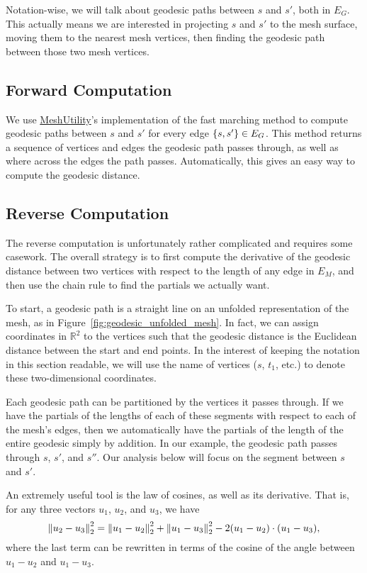 Notation-wise, we will talk about geodesic paths between \(s\) and \(s'\), both in \(E_G\). This actually means we are interested in projecting \(s\) and \(s'\) to the mesh surface, moving them to the nearest mesh vertices, then finding the geodesic path between those two mesh vertices.

\subsection{Forward Computation}
We use \href{https://github.com/zishun/MeshUtility}{MeshUtility}'s implementation of the fast marching method to compute geodesic paths between \(s\) and \(s'\) for every edge \(\cof{s, s'} \in E_G\). This method returns a sequence of vertices and edges the geodesic path passes through, as well as where across the edges the path passes. Automatically, this gives an easy way to compute the geodesic distance.

\subsection{Reverse Computation}
The reverse computation is unfortunately rather complicated and requires some casework. The overall strategy is to first compute the derivative of the geodesic distance between two vertices with respect to the length of any edge in \(E_M\), and then use the chain rule to find the partials we actually want.

To start, a geodesic path is a straight line on an unfolded representation of the mesh, as in Figure~\ref{fig:geodesic_unfolded_mesh}. In fact, we can assign coordinates in \(\mathbb{R}^2\) to the vertices such that the geodesic distance is the Euclidean distance between the start and end points. In the interest of keeping the notation in this section readable, we will use the name of vertices (\(s\), \(t_1\), etc.) to denote these two-dimensional coordinates.

Each geodesic path can be partitioned by the vertices it passes through. If we have the partials of the lengths of each of these segments with respect to each of the mesh's edges, then we automatically have the partials of the length of the entire geodesic simply by addition. In our example, the geodesic path passes through \(s\), \(s'\), and \(s''\). Our analysis below will focus on the segment between \(s\) and \(s'\).

An extremely useful tool is the law of cosines, as well as its derivative. That is, for any three vectors \(u_1\), \(u_2\), and \(u_3\), we have \[\norm{u_2 - u_3}_2^2 = \norm{u_1 - u_2}_2^2 + \norm{u_1 - u_3}_2^2 - 2\pof{u_1 - u_2} \cdot \pof{u_1 - u_3},\] where the last term can be rewritten in terms of the cosine of the angle between \(u_1 - u_2\) and \(u_1 - u_3\).

